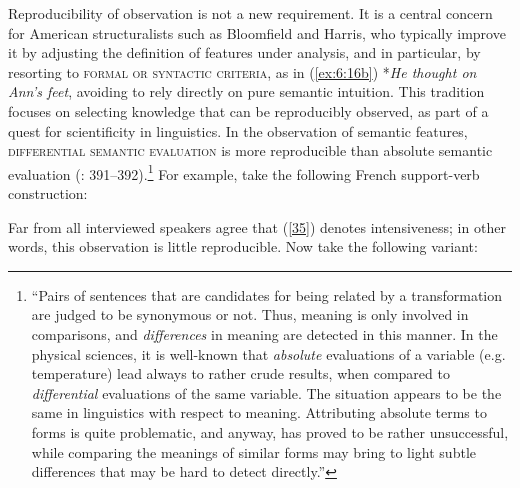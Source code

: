 \documentclass[output=paper]{langsci/langscibook}
\begin{document}
Reproducibility of observation is not a new requirement. It is a central concern for American structuralists such as Bloomfield and Harris, who typically improve 
it by adjusting the definition of features under analysis, and in particular, by resorting to \textsc{formal or syntactic criteria}, as in (\ref{ex:6:16b}) *\textit{He thought on Ann’s feet}, avoiding to rely directly on pure semantic intuition. This tradition focuses on selecting knowledge that can be reproducibly observed, as part of a quest for scientificity in linguistics. 
In the observation of semantic features, \textsc{differential semantic evaluation} is more reproducible than absolute semantic evaluation (\citealt{Gross:75-Relation}: 391–392).\footnote{“Pairs of sentences that are candidates for being related by a transformation are judged to be synonymous or not. Thus, meaning is only involved in comparisons, and \textit{differences} in meaning are detected in this manner. In the physical sciences, it is well-known that \textit{absolute} evaluations of a variable (e.g. temperature) lead always to rather crude results, when compared to \textit{differential} evaluations of the same variable. The situation appears to be the same in linguistics with respect to meaning. Attributing absolute terms to forms is quite problematic, and anyway, has proved to be rather unsuccessful, while comparing the meanings of similar forms may bring to light subtle differences that may be hard to detect directly.”} For example, take the following French support-verb construction:


\begin{exe}
\end{exe}

\noindent Far from all interviewed speakers agree that (\ref{35}) denotes intensiveness; in other words, this observation is little reproducible. Now take the following variant:


\begin{exe}
\end{exe}
\end{document}
